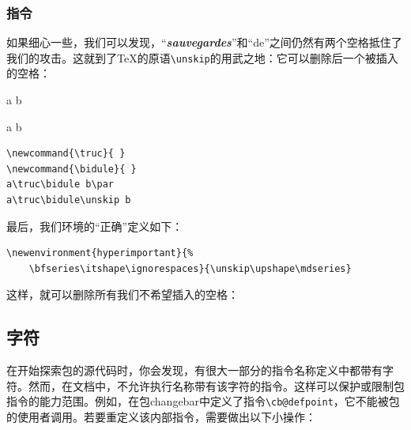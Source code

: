 \subsubsection{指令}

如果细心一些，我们可以发现，“{\bfseries\itshape sauvegardes}”和“de”之间仍然有两个空格抵住了我们的攻击。这就到了\TeX 的原语\verb|\unskip|的用武之地：它可以删除后一个被插入的空格：

\begin{codelist}[9.7]{
    \newcommand{\truc}{ }
\newcommand{\bidule}{ }
a\truc\bidule b\par
a\truc\bidule\unskip b
}
\begin{verbatim}
\newcommand{\truc}{ }
\newcommand{\bidule}{ }
a\truc\bidule b\par
a\truc\bidule\unskip b\end{verbatim}
\end{codelist}

最后，我们环境的“正确”定义如下：

\begin{dmd}
\begin{verbatim}
\newenvironment{hyperimportant}{% 
    \bfseries\itshape\ignorespaces}{\unskip\upshape\mdseries}\end{verbatim}
\end{dmd}

这样，就可以删除所有我们不希望插入的空格：

\renewenvironment{hyperimportant}{%
    \bfseries\itshape\ignorespaces}{\unskip\upshape\mdseries}


\subsection{字符}

在开始探索包的源代码时，你会发现，有很大一部分的指令名称定义中都带有字符。然而，在文档中，不允许执行名称带有该字符的指令。这样可以保护或限制包指令的能力范围。例如，在包\textsf{changebar}中定义了指令\verb+\cb@defpoint+，它不能被包的使用者调用。若要重定义该内部指令，需要做出以下小操作：


